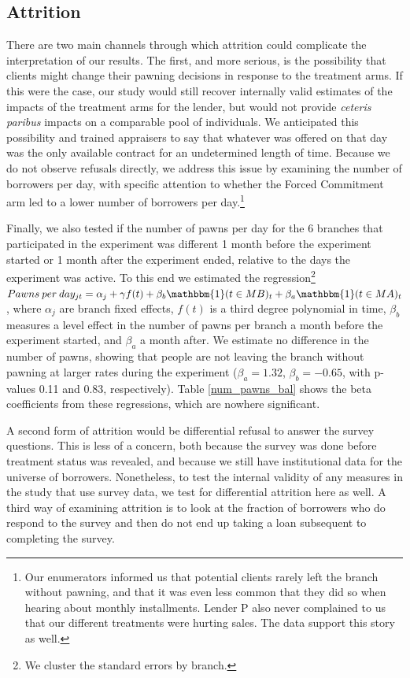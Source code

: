 \documentclass[oneside,11pt]{article}
\begin{document}
\subsection{Attrition}

There are two main channels through which attrition could complicate the interpretation of our results. The first, and more serious, is the possibility that clients might change their pawning decisions in response to the treatment arms.  If this were the case, our study would still recover internally valid estimates of the impacts of the treatment arms for the lender, but would not provide \textit{ceteris paribus} impacts on a comparable pool of individuals. We anticipated this possibility and trained appraisers to say that whatever was offered on that day was the only available contract for an undetermined length of time.  Because we do not observe refusals directly, we address this issue by examining the number of borrowers per day, with specific attention to whether the Forced Commitment arm led to a lower number of borrowers per day.\footnote{Our enumerators informed us that potential clients rarely left the branch without pawning, and that it was even less common that they did so when hearing about monthly installments. Lender P also never complained to us that our different treatments were hurting sales. The data support this story as well.}

Finally, we also tested if the number of pawns per day for the 6 branches that participated in the experiment was different 1 month before the experiment started or 1 month after the experiment ended, relative to the days the experiment was active. To this end we estimated the regression\footnote{We cluster the standard errors by branch.} $Pawns \: per \: day_{jt} = \alpha_j + \gamma f(t) + \beta_b \mathbbm{1}(t \in MB)_{t} +\beta_a \mathbbm{1}(t \in MA)_{t}$, where $\alpha_j$ are branch fixed effects, $f(t)$ is a third degree polynomial in time, $\beta_b$ measures a level effect in the number of pawns per branch a month before the experiment started, and $\beta_a$ a month after. We estimate no difference in the number of pawns, showing that people are not leaving the branch without pawning at larger rates during the experiment ($\beta_a=1.32$, $\beta_b=-0.65$, with p-values 0.11 and 0.83, respectively).  Table \ref{num_pawns_bal} shows the beta coefficients from these regressions, which are nowhere significant. 

A second form of attrition would be differential refusal to answer the survey questions.  This is less of a concern, both because the survey was done before treatment status was revealed, and because we still have institutional data for the universe of borrowers.  Nonetheless, to test the internal validity of any measures in the study that use survey data, we test for differential attrition here as well.  A third way of examining attrition is to look at the fraction of borrowers who do respond to the survey and then do not end up taking a loan subsequent to completing the survey.
\end{document}

